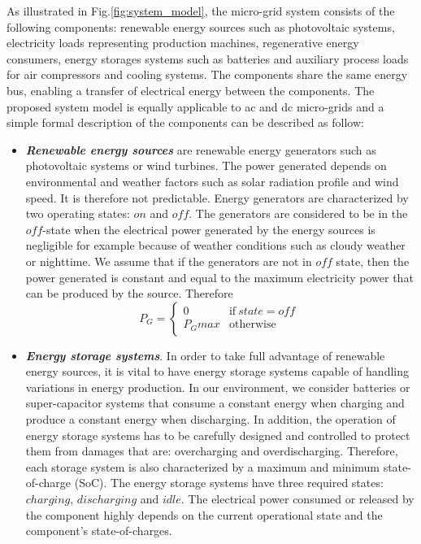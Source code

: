 As illustrated in Fig.\ref{fig:system_model}, the micro-grid system consists of the following components: renewable energy sources such as photovoltaic systems, electricity loads representing production machines, regenerative energy consumers, energy storages systems such as batteries and auxiliary process loads for air compressors and cooling systems. The components share the same energy bus, enabling a transfer of electrical energy between the components. The proposed system model is equally applicable to ac and dc micro-grids and a simple formal description of the components can be described as follow:
\begin{itemize}
\item{\textit{\textbf{ Renewable energy sources}} are renewable energy generators such as photovoltaic systems or wind turbines. The power generated depends on environmental and weather factors such as solar radiation profile and wind speed. It is therefore not predictable. Energy generators are characterized by two operating states: $on$ and $off$. The generators are considered to be in the $off$-state when the electrical power generated by the energy sources is negligible for example because of weather conditions such as cloudy weather or nighttime. We assume that if the generators are not in $off$ state, then the power generated is constant and equal to the maximum electricity power that can be produced by the source. Therefore
%
\begin{equation}
 P_G = 
 \begin{cases}
      0 & \text{if}\ state=off \\
      P_Gmax & \text{otherwise}
    \end{cases} \;
\end{equation}
%
 } 
\item{\textit{\textbf{Energy storage systems}}. In order to take full advantage of renewable energy sources, it is vital to have energy storage systems capable of handling variations in energy production. In our environment, we consider batteries or super-capacitor systems that consume a constant energy when charging and produce a constant energy when discharging. In addition, the operation of energy storage systems has to be carefully designed and controlled to protect them from damages that are: overcharging and overdischarging. Therefore, each storage system is also characterized by a maximum and minimum state-of-charge (SoC). The energy storage systems have three required states: $charging$, $discharging$ and $idle$. The electrical power consumed or released by the component highly depends on the current operational state and the component\rq{s} state-of-charges.}
 

\end{itemize}
